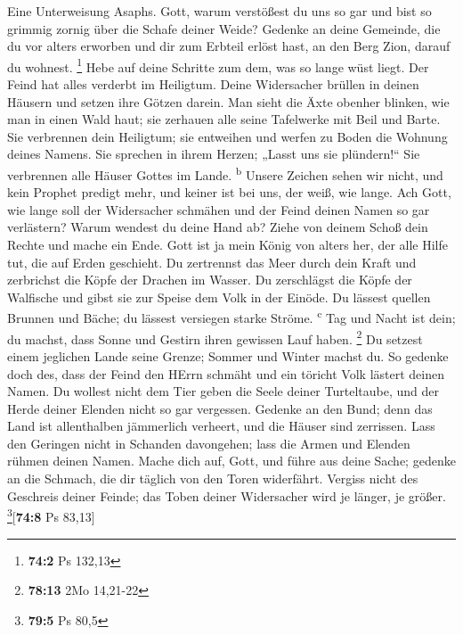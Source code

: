  Eine Unterweisung Asaphs. Gott, warum verstößest du uns
so gar und bist so grimmig zornig über die Schafe deiner Weide?
 Gedenke an deine Gemeinde, die du vor alters erworben und
dir zum Erbteil erlöst hast, an den Berg Zion, darauf du wohnest.
\footnote{\textbf{74:2} Ps 132,13}  Hebe auf deine
Schritte zum dem, was so lange wüst liegt. Der Feind hat alles verderbt
im Heiligtum.  Deine Widersacher brüllen in deinen Häusern
und setzen ihre Götzen darein.  Man sieht die Äxte obenher
blinken, wie man in einen Wald haut;  sie zerhauen alle
seine Tafelwerke mit Beil und Barte.  Sie verbrennen dein
Heiligtum; sie entweihen und werfen zu Boden die Wohnung deines Namens.
 Sie sprechen in ihrem Herzen; „Lasst uns sie
plündern!{}`` Sie verbrennen alle Häuser Gottes im Lande.
\textsuperscript{b}  Unsere Zeichen sehen wir nicht, und
kein Prophet predigt mehr, und keiner ist bei uns, der weiß, wie lange.
 Ach Gott, wie lange soll der Widersacher schmähen und
der Feind deinen Namen so gar verlästern?  Warum wendest
du deine Hand ab? Ziehe von deinem Schoß dein Rechte und mache ein Ende.
 Gott ist ja mein König von alters her, der alle Hilfe
tut, die auf Erden geschieht.  Du zertrennst das Meer
durch dein Kraft und zerbrichst die Köpfe der Drachen im Wasser.
 Du zerschlägst die Köpfe der Walfische und gibst sie zur
Speise dem Volk in der Einöde.  Du lässest quellen
Brunnen und Bäche; du lässest versiegen starke Ströme.
\textsuperscript{c}  Tag und Nacht ist dein; du machst,
dass Sonne und Gestirn ihren gewissen Lauf haben. \footnote{\textbf{78:13}
  2Mo 14,21-22}  Du setzest einem jeglichen Lande seine
Grenze; Sommer und Winter machst du.  So gedenke doch
des, dass der Feind den HErrn schmäht und ein töricht Volk lästert
deinen Namen.  Du wollest nicht dem Tier geben die Seele
deiner Turteltaube, und der Herde deiner Elenden nicht so gar vergessen.
 Gedenke an den Bund; denn das Land ist allenthalben
jämmerlich verheert, und die Häuser sind zerrissen.  Lass
den Geringen nicht in Schanden davongehen; lass die Armen und Elenden
rühmen deinen Namen.  Mache dich auf, Gott, und führe aus
deine Sache; gedenke an die Schmach, die dir täglich von den Toren
widerfährt.  Vergiss nicht des Geschreis deiner Feinde;
das Toben deiner Widersacher wird je länger, je größer.
\footnote{\textbf{79:5} Ps 80,5}{[}\textbf{74:8} Ps 83,13{]}


